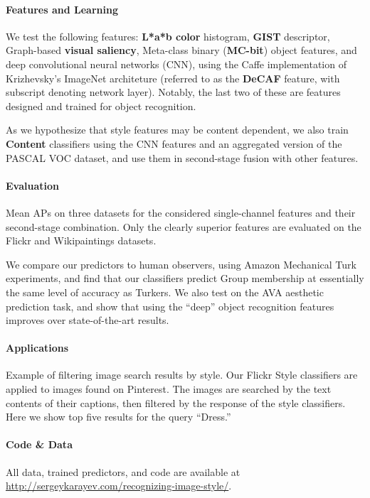 \documentclass[extendedabs]{bmvc2k}
\begin{document}
\vspace{.666em}

\newpage

\paragraph{Features and Learning}
We test the following features: \textbf{L*a*b color} histogram, \textbf{GIST} descriptor, Graph-based \textbf{visual saliency}, Meta-class binary (\textbf{MC-bit}) object features, and deep convolutional neural networks (CNN), using the Caffe implementation of Krizhevsky's ImageNet architeture (referred to as the \textbf{DeCAF} feature, with subscript denoting network layer).
Notably, the last two of these are features designed and trained for object recognition.

As we hypothesize that style features may be content dependent, we also train \textbf{Content} classifiers using the CNN features and an aggregated version of the PASCAL VOC dataset, and use them in second-stage fusion with other features.

\paragraph{Evaluation}
Mean APs on three datasets for the considered single-channel features and their second-stage combination.
Only the clearly superior features are evaluated on the Flickr and Wikipaintings datasets.

{\footnotesize }

\vspace{.666em}
We compare our predictors to human observers, using Amazon Mechanical Turk experiments, and find that our classifiers predict Group membership at essentially the same level of accuracy as Turkers.
We also test on the AVA aesthetic prediction task, and show that using the ``deep'' object recognition features improves over state-of-the-art results.

\paragraph{Applications}
Example of filtering image search results by style.
Our Flickr Style classifiers are applied to images found on Pinterest.
The images are searched by the text contents of their captions, then filtered by the response of the style classifiers.
Here we show top five results for the query ``Dress.''



\paragraph{Code \& Data}
All data, trained predictors, and code are available at\\
{\small \url{http://sergeykarayev.com/recognizing-image-style/}}.
\end{document}
